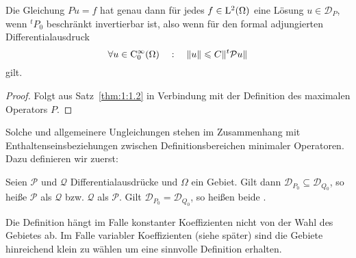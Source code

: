 \begin{thm}
Die Gleichung $Pu=f$ hat genau dann für jedes $f\in\mathrm L^2(\Omega)$ eine L\"osung $u\in\mathcal D_{P}$, wenn ${}^t P_0$ beschränkt invertierbar ist, also wenn f\"ur den formal adjungierten Differentialausdruck
\begin{equation}
  \forall u\in\mathrm C^\infty_0(\Omega)\quad:\quad   \|u\| \leqslant C \| {}^t{\mathcal P} u \|
\end{equation}
gilt.
\end{thm}
\begin{proof}
Folgt aus Satz~\ref{thm:1:1.2} in Verbindung mit der Definition des maximalen Operators $P$.
\end{proof}

Solche und allgemeinere Ungleichungen stehen im Zusammenhang mit Enthaltenseinsbeziehungen zwischen Definitionsbereichen minimaler Operatoren. Dazu definieren wir zuerst: 
\begin{df}\label{df:1:1.2}
Seien $\mathcal P$ und $\mathcal Q$ Differentialausdrücke und $\Omega$ ein Gebiet. Gilt dann $\mathcal D_{P_0}\subseteq \mathcal D_{Q_0}$, so heiße $\mathcal P$  als $\mathcal Q$ bzw. $\mathcal Q$  als $\mathcal P$. Gilt $\mathcal D_{P_0}=\mathcal D_{Q_0}$, so heißen beide .
\end{df}
Die  Definition hängt im Falle konstanter Koeffizienten nicht von der Wahl des Gebietes ab. Im Falle variabler Koeffizienten (siehe später) sind die Gebiete hinreichend klein zu wählen um eine sinnvolle Definition erhalten.

